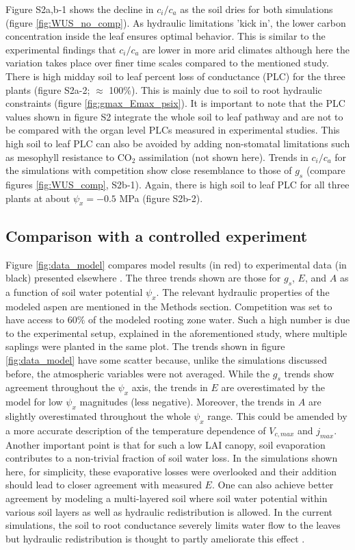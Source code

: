 \documentclass[utf8]{frontiersSCNS} %
\begin{document}
Figure S2a,b-1 shows the decline in $c_i / c_a$ as the soil dries for both simulations (figure \ref{fig:WUS_no_comp}). As hydraulic limitations 'kick in', the lower carbon concentration inside the leaf ensures optimal behavior. This is similar to the experimental findings that $c_i / c_a$ are lower in more arid climates \citep{prentice2014balancing} although here the variation takes place over finer time scales compared to the mentioned study. There is high midday soil to leaf percent loss of conductance (PLC) for the three plants (figure S2a-2; $\approx$ 100\%). This is mainly due to soil to root hydraulic constraints (figure \ref{fig:gmax_Emax_psix}). It is important to note that the PLC values shown in figure S2 integrate the whole soil to leaf pathway and are not to be compared with the organ level PLCs measured in experimental studies. This high soil to leaf PLC can also be avoided by adding non-stomatal limitations such as mesophyll resistance to CO$_2$ assimilation (not shown here). Trends in $c_i / c_a$ for the simulations with competition show close resemblance to those of $g_s$ (compare figures \ref{fig:WUS_comp}, S2b-1). Again, there is high soil to leaf PLC for all three plants at about $\psi_x = -0.5$ MPa (figure S2b-2). 

\subsection{Comparison with a controlled experiment}

Figure \ref{fig:data_model} compares model results (in red) to experimental data (in black) presented elsewhere \citep{venturas_2018}. The three trends shown are those for $g_s$, $E$, and $A$ as a function of soil water potential $\psi_x$. The relevant hydraulic properties of the modeled aspen are mentioned in the Methods section. Competition was set to have access to $60\%$ of the modeled rooting zone water. Such a high number is due to the experimental setup, explained in the aforementioned study, where multiple saplings were planted in the same plot. The trends shown in figure \ref{fig:data_model} have some scatter because, unlike the simulations discussed before, the atmospheric variables were not averaged. While the $g_s$ trends show agreement throughout the $\psi_x$ axis, the trends in $E$ are overestimated by the model for low $\psi_x$ magnitudes (less negative). Moreover, the trends in $A$ are slightly overestimated throughout the whole $\psi_x$ range. This could be amended by a more accurate description of the temperature dependence of $V_{c,max}$ and $j_{max}$. Another important point is that for such a low LAI canopy, soil evaporation contributes to a non-trivial fraction of soil water loss. In the simulations shown here, for simplicity, these evaporative losses were overlooked and their addition should lead to closer agreement with measured $E$. One can also achieve better agreement by modeling a multi-layered soil where soil water potential within various soil layers as well as hydraulic redistribution is allowed. In the current simulations, the soil to root conductance severely limits water flow to the leaves but hydraulic redistribution is thought to partly ameliorate this effect \citep{huang_2017}.
\end{document}
